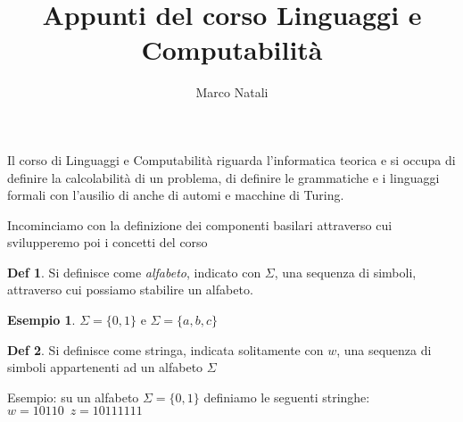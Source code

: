 \documentclass[a4paper]{report}
\theoremstyle{definition}%
\newtheorem*{defi}{Def}%
\newtheorem*{esempio}{Esempio}
\begin{document}
\title{Appunti del corso Linguaggi e Computabilità}
\author{Marco Natali}
\date{}
\maketitle

Il corso di Linguaggi e Computabilità riguarda l'informatica teorica e si occupa di definire la calcolabilità di un problema,
di definire le grammatiche e i linguaggi formali con l'ausilio di anche di automi e macchine di Turing.

Incominciamo con la definizione dei componenti basilari attraverso cui svilupperemo poi i concetti del corso
\begin{defi}
  Si definisce come \emph{alfabeto}, indicato con $\Sigma$, una sequenza di simboli, attraverso cui possiamo stabilire un alfabeto.
\end{defi}
\begin{esempio}
  $\Sigma = \{0, 1\}$ e $\Sigma = \{a, b, c\}$
\end{esempio}

\begin{defi}
  Si definisce come stringa, indicata solitamente con $w$, una sequenza di simboli appartenenti ad un alfabeto $\Sigma$
\end{defi}
Esempio: su un alfabeto $\Sigma = \{0, 1\}$ definiamo le seguenti stringhe:
  $w = 10110 \,\,\, z = 10111111$
\end{document}
